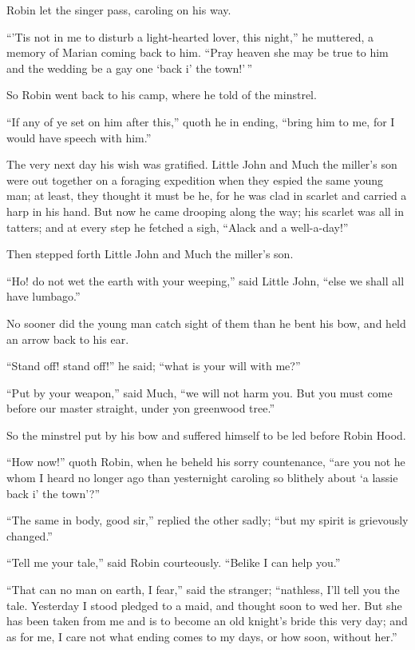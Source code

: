 Robin let the singer pass, caroling on his way.

``'Tis not in me to disturb a light-hearted lover, this night,'' he
muttered, a memory of Marian coming back to him. ``Pray heaven she may
be true to him and the wedding be a gay one `back i' the town!'\,''

So Robin went back to his camp, where he told of the minstrel.

``If any of ye set on him after this,'' quoth he in ending, ``bring him
to me, for I would have speech with him.''

The very next day his wish was gratified. Little John and Much the
miller's son were out together on a foraging expedition when they espied
the same young man; at least, they thought it must be he, for he was
clad in scarlet and carried a harp in his hand. But now he came drooping
along the way; his scarlet was all in tatters; and at every step he
fetched a sigh, ``Alack and a well-a-day!''

Then stepped forth Little John and Much the miller's son.

``Ho! do not wet the earth with your weeping,'' said Little John, ``else
we shall all have lumbago.''

No sooner did the young man catch sight of them than he bent his bow,
and held an arrow back to his ear.

``Stand off! stand off!'' he said; ``what is your will with me?''

``Put by your weapon,'' said Much, ``we will not harm you. But you must
come before our master straight, under yon greenwood tree.''

So the minstrel put by his bow and suffered himself to be led before
Robin Hood.

``How now!'' quoth Robin, when he beheld his sorry countenance, ``are
you not he whom I heard no longer ago than yesternight caroling so
blithely about `a lassie back i' the town'?''

``The same in body, good sir,'' replied the other sadly; ``but my spirit
is grievously changed.''

``Tell me your tale,'' said Robin courteously. ``Belike I can help
you.''

``That can no man on earth, I fear,'' said the stranger; ``nathless,
I'll tell you the tale. Yesterday I stood pledged to a maid, and thought
soon to wed her. But she has been taken from me and is to become an old
knight's bride this very day; and as for me, I care not what ending
comes to my days, or how soon, without her.''

